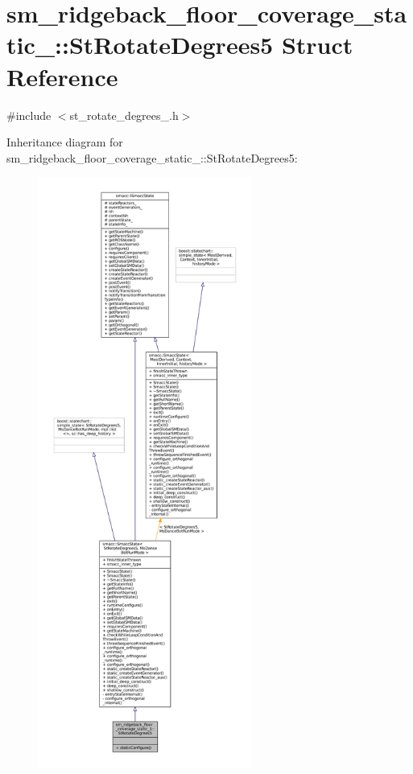 \hypertarget{structsm__ridgeback__floor__coverage__static__1_1_1StRotateDegrees5}{}\section{sm\+\_\+ridgeback\+\_\+floor\+\_\+coverage\+\_\+static\+\_\+:\+:St\+Rotate\+Degrees5 Struct Reference}
\label{structsm__ridgeback__floor__coverage__static__1_1_1StRotateDegrees5}


{\ttfamily \#include $<$st\+\_\+rotate\+\_\+degrees\+\_.\+h$>$}



Inheritance diagram for sm\+\_\+ridgeback\+\_\+floor\+\_\+coverage\+\_\+static\+\_\+:\+:St\+Rotate\+Degrees5\+:
\nopagebreak
\begin{figure}[H]
\begin{center}
\leavevmode
\includegraphics[height=550pt]{structsm__ridgeback__floor__coverage__static__1_1_1StRotateDegrees5__inherit__graph}
\end{center}
\end{figure}


